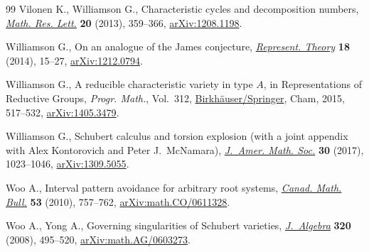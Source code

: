 \begin{thebibliography}{99}
Vilonen K., Williamson G., Characteristic cycles and decomposition numbers,
 \href{https://doi.org/10.4310/MRL.2013.v20.n2.a11}{\textit{Math. Res. Lett.}} \textbf{20} (2013), 359--366, \href{https://arxiv.org/abs/1208.1198}{arXiv:1208.1198}.

Williamson G., On an analogue of the {J}ames conjecture, \href{https://doi.org/10.1090/S1088-4165-2014-00447-3}{\textit{Represent.
 Theory}} \textbf{18} (2014), 15--27, \href{https://arxiv.org/abs/1212.0794}{arXiv:1212.0794}.

Williamson G., A reducible characteristic variety in type {$A$}, in
 Representations of Reductive Groups, \textit{Progr. Math.}, Vol.~312,
 \href{https://doi.org/10.1007/978-3-319-23443-4_19}{Birkh\"auser/Springer}, Cham, 2015, 517--532, \href{https://arxiv.org/abs/1405.3479}{arXiv:1405.3479}.

Williamson G., Schubert calculus and torsion explosion (with a joint appendix
 with Alex Kontorovich and Peter J.~McNamara), \href{https://doi.org/10.1090/jams/868}{\textit{J.~Amer. Math. Soc.}}
 \textbf{30} (2017), 1023--1046, \href{https://arxiv.org/abs/1309.5055}{arXiv:1309.5055}.

Woo A., Interval pattern avoidance for arbitrary root systems, \href{https://doi.org/10.4153/CMB-2010-080-2}{\textit{Canad.
 Math. Bull.}} \textbf{53} (2010), 757--762, \href{https://arxiv.org/abs/math.CO/0611328}{arXiv:math.CO/0611328}.

Woo A., Yong A., Governing singularities of {S}chubert varieties,
 \href{https://doi.org/10.1016/j.jalgebra.2007.12.016}{\textit{J.~Algebra}} \textbf{320} (2008), 495--520, \href{https://arxiv.org/abs/math.AG/0603273}{arXiv:math.AG/0603273}.

\end{thebibliography}
